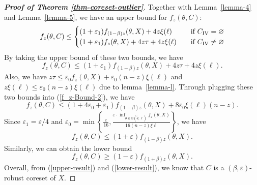 \begin{proof}[\textbf{Proof of Theorem \ref{thm-coreset-outlier}}]
Together with Lemma~\ref{lemma-4} and Lemma~\ref{lemma-5}, we have an upper bound for $ f_z(\theta,C) $: 
\begin{equation}\label{f_z-Bound}
	f_z(\theta,C)\leq
	\begin{cases}
		(1+\varepsilon_1)f_{(1-\beta)z}(\theta,X)+4z\xi(\ell) \quad& \text{if } C_\mathrm{\Rnum{4}}=\varnothing \\
		(1+\varepsilon_1)f_z(\theta,X)+4z\tau+4z\xi(\ell) \quad& \text{if } C_\mathrm{\Rnum{4}}\ne\varnothing
	\end{cases}
\end{equation}
By taking the upper bound of these two bounds, we have 
\begin{equation}\label{f_z-Bound-2}
	f_z(\theta,C)\leq (1+\varepsilon_1)f_{(1-\beta)z}(\theta,X)+4z\tau+4z\xi(\ell).
\end{equation}
Also, we have $ z\tau\leq \varepsilon_0 f_z(\theta,X)+\varepsilon_0(n-z)\xi(\ell) $ and $ z\xi(\ell)\leq \varepsilon_0(n-z)\xi(\ell) $ due to lemma~\ref{lemma-l}. Through plugging these two bounds into (\ref{f_z-Bound-2}), we have
\begin{equation}
	f_z(\theta,C)\leq (1+4\varepsilon_0+\varepsilon_1)f_{(1-\beta)z}(\theta,X)+8\varepsilon_0\xi(\ell)(n-z).
\end{equation}
Since $ \varepsilon_1=\varepsilon/4 $ and $ \varepsilon_0=\min \left\{ \frac{\varepsilon}{16},\frac{\varepsilon\cdot\inf_{\theta\in\mathbb{B}(\tilde{\theta}, \ell)} f_z(\theta,X)}{16(n-z)\xi{\ell}} \right\} $, we have
\begin{equation}\label{upper-result}
    f_z(\theta,C)\leq (1+\varepsilon)f_{(1-\beta)z}(\theta,X).
\end{equation}
Similarly, we can obtain the lower bound
\begin{equation}\label{lower-result}
     f_{z}(\theta,C) \geq (1-\varepsilon) f_{(1+\beta)z}(\theta,X).
\end{equation}
Overall, from (\ref{upper-result}) and (\ref{lower-result}), we know that $ C $ is a $(\beta,\varepsilon)$-robust coreset of $ X $.
\end{proof}

